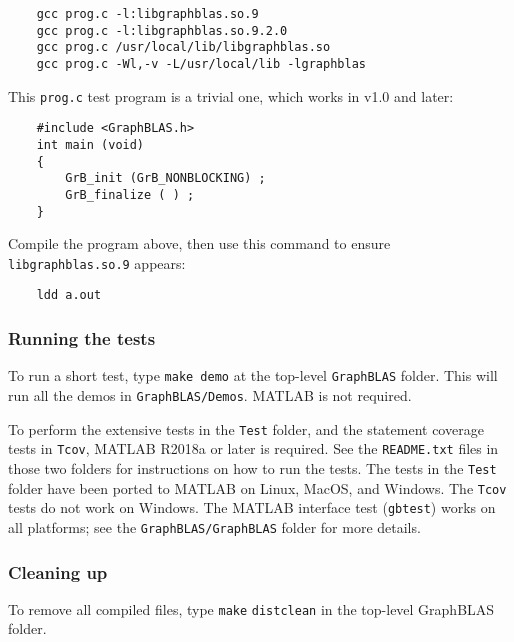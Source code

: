 \documentclass[12pt]{article}
\begin{document}
    {\small
    \begin{verbatim}
    gcc prog.c -l:libgraphblas.so.9
    gcc prog.c -l:libgraphblas.so.9.2.0
    gcc prog.c /usr/local/lib/libgraphblas.so
    gcc prog.c -Wl,-v -L/usr/local/lib -lgraphblas \end{verbatim} }

This \verb'prog.c' test program is a trivial one, which works in v1.0 and
later:

    {\small
    \begin{verbatim}
    #include <GraphBLAS.h>
    int main (void)
    {
        GrB_init (GrB_NONBLOCKING) ;
        GrB_finalize ( ) ;
    } \end{verbatim} }

Compile the program above, then use this command to ensure
\verb'libgraphblas.so.9' appears:

    {\small
    \begin{verbatim}
    ldd a.out \end{verbatim} }

\subsubsection{Running the tests}

To run a short test, type \verb'make demo' at the top-level \verb'GraphBLAS'
folder.  This will run all the demos in \verb'GraphBLAS/Demos'.  MATLAB is not
required.

To perform the extensive tests in the \verb'Test' folder, and the statement
coverage tests in \verb'Tcov', MATLAB R2018a or later is required.  See the
\verb'README.txt' files in those two folders for instructions on how to run the
tests.  The tests in the \verb'Test' folder have been ported to MATLAB on
Linux, MacOS, and Windows.  The \verb'Tcov' tests do not work on Windows.  The
MATLAB interface test (\verb'gbtest') works on all platforms; see the
\verb'GraphBLAS/GraphBLAS' folder for more details.

\subsubsection{Cleaning up}

To remove all compiled files, type \verb'make' \verb'distclean' in the top-level
GraphBLAS folder.
\end{document}
